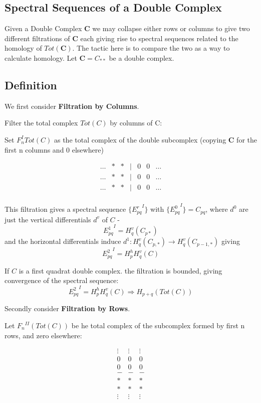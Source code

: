 \subsection{Spectral Sequences of a Double Complex}\label{df4.5.5}
Given a Double Complex $\mathbf C$ we may collapse either rows or
columns to give two different filtrations of $\mathbf C$ each
giving rise to spectral sequences related to the homology of
$Tot(\mathbf C)$. The tactic here is to compare the two as a way
to calculate homology. Let $\mathbf C = C_{**}$ be a double
complex.

\subsection*{Definition}
We first consider \textbf{Filtration by Columns}.

Filter the total complex $Tot(C)$ by columns of C:

Set $F^I_n Tot(C)$ as the total complex of the double subcomplex
(copying $\mathbf C$ for the first n columns and 0 elsewhere)

$$\begin{array}{ccccccc}
  \dots & * & * & | & 0 & 0 & \dots \\
  \dots & * & * & | & 0 & 0 & \dots \\
  \dots & * & * & | & 0 & 0 & \dots \\
\end{array}$$

This filtration gives a spectral sequence $\{ {E^r_{pq}}^I \}$
with $\{ {E^0_{pq}}^I \} = C_{pq}$, where $d^0$ are just the
vertical differentials $d^v$ of $C$ -
$$ {E^1_{pq}}^I  = H^v_q ( C_{p*} )$$
and the horizontal differentials induce $d^1 : H^v_q (C_{p,*} )
\rightarrow H_q^v (C_{p-1,*})$ giving
$$ {E^2_{pq}}^I  = H^h_p H_q^v (C)$$

If $C$ is a first quadrat double complex. the filtration is
bounded, giving convergence of the spectral sequence:
$$ {E^2_{pq}}^I  = H^h_pH^v_q (C) \Longrightarrow H_{p+q}
(Tot(C))$$

Secondly consider \textbf{Filtration by Rows}.

Let ${F_n}^{II}(Tot(C))$ be he total complex of the subcomplex
formed by first n rows, and zero elsewhere:

$$\begin{array}{ccc}
  \vdots & \vdots & \vdots \\
  0 & 0 & 0 \\
  0 & 0 & 0 \\
  - & - & - \\
  * & * & * \\
  * & * & * \\
  \vdots & \vdots & \vdots \\
\end{array}$$

